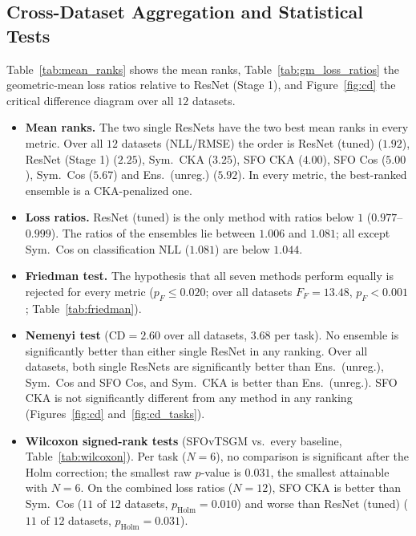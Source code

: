 \documentclass[11pt, a4paper]{article}
\begin{document}
\subsection{Cross-Dataset Aggregation and Statistical Tests}
Table~\ref{tab:mean_ranks} shows the mean ranks, Table~\ref{tab:gm_loss_ratios} the geometric-mean loss ratios relative to ResNet (Stage 1), and Figure~\ref{fig:cd} the critical difference diagram over all $12$ datasets.
\begin{itemize}
    \item \textbf{Mean ranks.} The two single ResNets have the two best mean ranks in every metric. Over all $12$ datasets (NLL/RMSE) the order is ResNet (tuned) ($1.92$), ResNet (Stage 1) ($2.25$), Sym.\ CKA ($3.25$), SFO CKA ($4.00$), SFO Cos ($5.00$), Sym.\ Cos ($5.67$) and Ens.\ (unreg.) ($5.92$). In every metric, the best-ranked ensemble is a CKA-penalized one.
    \item \textbf{Loss ratios.} ResNet (tuned) is the only method with ratios below $1$ ($0.977$--$0.999$). The ratios of the ensembles lie between $1.006$ and $1.081$; all except Sym.\ Cos on classification NLL ($1.081$) are below $1.044$.
    \item \textbf{Friedman test.} The hypothesis that all seven methods perform equally is rejected for every metric ($p_F \le 0.020$; over all datasets $F_F = 13.48$, $p_F < 0.001$; Table~\ref{tab:friedman}).
    \item \textbf{Nemenyi test} ($\text{CD} = 2.60$ over all datasets, $3.68$ per task). No ensemble is significantly better than either single ResNet in any ranking. Over all datasets, both single ResNets are significantly better than Ens.\ (unreg.), Sym.\ Cos and SFO Cos, and Sym.\ CKA is better than Ens.\ (unreg.). SFO CKA is not significantly different from any method in any ranking (Figures~\ref{fig:cd} and~\ref{fig:cd_tasks}).
    \item \textbf{Wilcoxon signed-rank tests} (SFOvTSGM vs.\ every baseline, Table~\ref{tab:wilcoxon}). Per task ($N = 6$), no comparison is significant after the Holm correction; the smallest raw $p$-value is $0.031$, the smallest attainable with $N = 6$. On the combined loss ratios ($N = 12$), SFO CKA is better than Sym.\ Cos ($11$ of $12$ datasets, $p_{\text{Holm}} = 0.010$) and worse than ResNet (tuned) ($11$ of $12$ datasets, $p_{\text{Holm}} = 0.031$).
\end{itemize}



\end{document}
